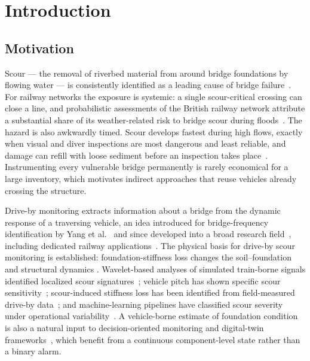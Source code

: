 \section{Introduction}
\label{sec:introduction}

\subsection{Motivation}
\label{sec:motivation}

Scour --- the removal of riverbed material from around bridge foundations by
flowing water --- is consistently identified as a leading cause of bridge
failure~\cite{wardhana2003analysis, arneson2012hec18}. For railway networks the
exposure is systemic: a single scour-critical crossing can close a line, and
probabilistic assessments of the British railway network attribute a
substantial share of its weather-related risk to bridge scour during
floods~\cite{lamb2019scour}. The hazard is also awkwardly timed. Scour develops
fastest during high flows, exactly when visual and diver inspections are most
dangerous and least reliable, and damage can refill with loose sediment before
an inspection takes place~\cite{prendergast2014review, arneson2012hec18}.
Instrumenting every vulnerable bridge permanently is rarely economical for a
large inventory, which motivates indirect approaches that reuse vehicles
already crossing the structure.

Drive-by monitoring extracts information about a bridge from the dynamic
response of a traversing vehicle, an idea introduced for bridge-frequency
identification by Yang et al.~\cite{yang2004extracting} and since developed
into a broad research field~\cite{malekjafarian2015review}, including dedicated
railway applications~\cite{braganca2023review, souza2023review}. The physical
basis for drive-by scour monitoring is established: foundation-stiffness loss
changes the soil--foundation and structural dynamics
\cite{prendergast2013investigation, prendergast2016determining}. Wavelet-based
analyses of simulated train-borne signals identified localized scour
signatures~\cite{fitzgerald2019drive}; vehicle pitch has shown specific scour
sensitivity~\cite{mcgeown2024pitch}; scour-induced stiffness loss has been
identified from field-measured drive-by data~\cite{tola2025scour}; and
machine-learning pipelines have classified scour severity under operational
variability~\cite{fernandes2024driveby, fernandes2025early,
fernandes2026early, fernandes2026canelas}. A vehicle-borne estimate of
foundation condition is also a natural input to decision-oriented monitoring
and digital-twin frameworks~\cite{kamariotis2023framework,
torzoni2024digital}, which benefit from a continuous component-level state
rather than a binary alarm.

